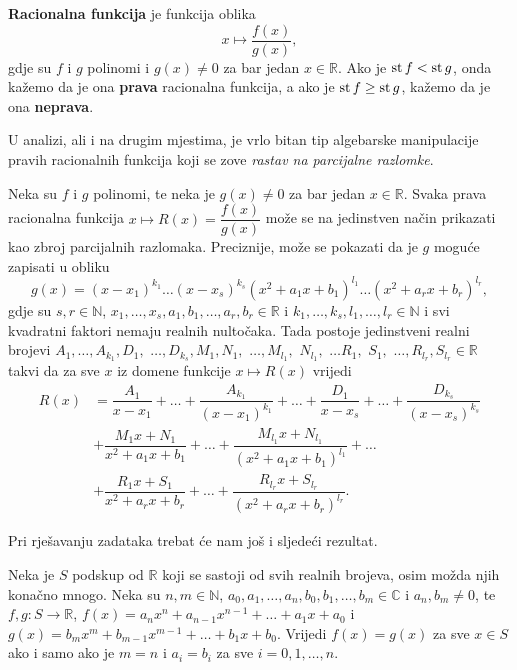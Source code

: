 \begin{definition}
\textbf{Racionalna funkcija} je funkcija oblika
\[x\mapsto \dfrac{f(x)}{g(x)},\]
gdje su \(f\) i \(g\) polinomi i \(g(x)\neq 0\) za bar jedan \(x\in \mathbb{R}\). Ako je \(\operatorname{st}{f}<\operatorname{st}{g}\), onda kažemo da je ona \textbf{prava} racionalna funkcija, a ako je \(\operatorname{st}{f}\geq \operatorname{st}{g}\), kažemo da je ona \textbf{neprava}.
\end{definition}
U analizi, ali i na drugim mjestima, je vrlo bitan tip algebarske manipulacije pravih racionalnih funkcija koji se zove \textit{rastav na parcijalne razlomke}.
\begin{remark}
\label{partfrac}
Neka su \(f\) i \(g\) polinomi, te neka je $g(x)\neq 0$ za bar jedan $x\in \mathbb{R}$. Svaka prava racionalna funkcija \(x\mapsto R(x)=\dfrac{f(x)}{g(x)}\) može se na jedinstven način prikazati kao zbroj parcijalnih razlomaka. Preciznije, može se pokazati da je \(g\) moguće zapisati u obliku
\[g(x)=(x-x_1)^{k_1}\dots (x-x_s)^{k_s}(x^2+a_1x+b_1)^{l_1}\dots (x^2+a_rx+b_r)^{l_r},\]
gdje su $s, r\in \mathbb{N}$, $x_1, \dots, x_s, a_1, b_1, \dots, a_r, b_r\in \mathbb{R}$ i $k_1, \dots, k_s, l_1, \dots, l_r\in \mathbb{N}$ i svi kvadratni faktori nemaju realnih nultočaka. Tada postoje jedinstveni realni brojevi \(A_1, \dots, A_{k_1}, D_1,\) \(\dots, D_{k_s}, M_1, N_1,\) \( \dots, M_{l_1},\) \( N_{l_1},\) \( \dots R_1,\) \( S_1,\) \(\dots, R_{l_r}, S_{l_r}\in \mathbb{R}\) takvi da za sve \(x\) iz domene funkcije \(x\mapsto R(x)\) vrijedi
\begin{align*}
R(x)&=\dfrac{A_1}{x-x_1}+\dots+\dfrac{A_{k_1}}{(x-x_1)^{k_1}}+\dots+\dfrac{D_1}{x-x_s}+\dots+\dfrac{D_{k_s}}{(x-x_s)^{k_s}} \\
&+\dfrac{M_1x+N_1}{x^2+a_1x+b_1}+\dots+\dfrac{M_{l_1}x+N_{l_1}}{(x^2+a_1x+b_1)^{l_1}}+\dots \\
&+\dfrac{R_1x+S_1}{x^2+a_rx+b_r}+\dots+\dfrac{R_{l_r}x+S_{l_r}}{(x^2+a_rx+b_r)^{l_r}}.
\end{align*}
\end{remark}
Pri rješavanju zadataka trebat će nam još i sljedeći rezultat.
\begin{remark}
\label{poleq}
Neka je \(S\) podskup od \(\mathbb{R}\) koji se sastoji od svih realnih brojeva, osim možda njih konačno mnogo.
Neka su $n, m\in \mathbb{N}$, $a_0, a_1, \dots, a_n, b_0, b_1, \dots, b_m\in \mathbb{C}$ i $a_n, b_m\neq 0$, te $f, g : S\to \mathbb{R}$, $f(x)=a_nx^n+a_{n-1}x^{n-1}+\dots+a_1x+a_0$ i $g(x)=b_mx^m+b_{m-1}x^{m-1}+\dots+b_1x+b_0$. Vrijedi $f(x)=g(x)$ za sve $x\in S$ ako i samo ako je $m=n$ i $a_i=b_i$ za sve $i=0, 1, \dots, n$.
\end{remark}
